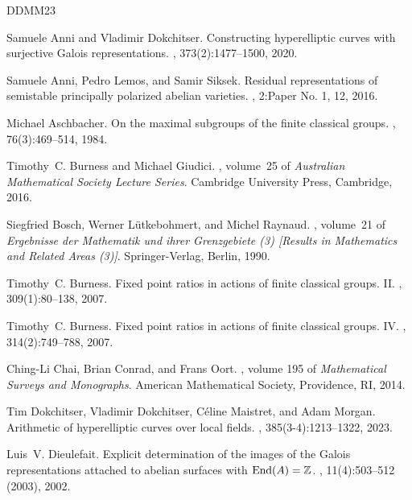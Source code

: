 \documentclass[11pt,a4paper]{article}
\begin{document}
\begin{thebibliography}{DDMM23}

Samuele Anni and Vladimir Dokchitser.
\newblock Constructing hyperelliptic curves with surjective {G}alois representations.
, 373(2):1477--1500, 2020.

Samuele Anni, Pedro Lemos, and Samir Siksek.
\newblock Residual representations of semistable principally polarized abelian varieties.
, 2:Paper No. 1, 12, 2016.

Michael Aschbacher.
\newblock On the maximal subgroups of the finite classical groups.
, 76(3):469--514, 1984.

Timothy~C. Burness and Michael Giudici.
, volume~25 of {\em Australian Mathematical Society Lecture Series}.
\newblock Cambridge University Press, Cambridge, 2016.

Siegfried Bosch, Werner L\"{u}tkebohmert, and Michel Raynaud.
, volume~21 of {\em Ergebnisse der Mathematik und ihrer Grenzgebiete (3) [Results in Mathematics and Related Areas (3)]}.
\newblock Springer-Verlag, Berlin, 1990.

Timothy~C. Burness.
\newblock Fixed point ratios in actions of finite classical groups. {II}.
, 309(1):80--138, 2007.

Timothy~C. Burness.
\newblock Fixed point ratios in actions of finite classical groups. {IV}.
, 314(2):749--788, 2007.

Ching-Li Chai, Brian Conrad, and Frans Oort.
, volume 195 of {\em Mathematical Surveys and Monographs}.
\newblock American Mathematical Society, Providence, RI, 2014.

Tim Dokchitser, Vladimir Dokchitser, C\'eline Maistret, and Adam Morgan.
\newblock Arithmetic of hyperelliptic curves over local fields.
, 385(3-4):1213--1322, 2023.

Luis~V. Dieulefait.
\newblock Explicit determination of the images of the {G}alois representations attached to abelian surfaces with {${\rm End}(A)=\Bbb Z$}.
, 11(4):503--512 (2003), 2002.


\end{thebibliography}
\end{document}
